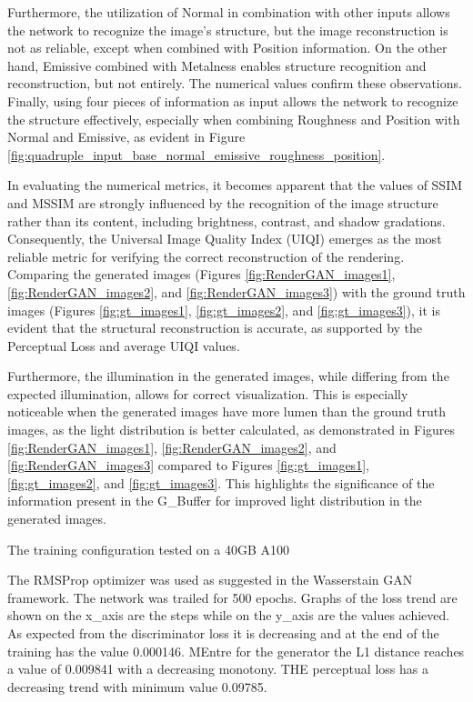 Furthermore, the utilization of Normal in combination with other inputs allows the network to recognize the image's structure, but the image reconstruction is not as reliable, except when combined with Position information. On the other hand, Emissive combined with Metalness enables structure recognition and reconstruction, but not entirely. The numerical values confirm these observations. Finally, using four pieces of information as input allows the network to recognize the structure effectively, especially when combining Roughness and Position with Normal and Emissive, as evident in Figure \ref{fig:quadruple_input_base_normal_emissive_roughness_position}.

In evaluating the numerical metrics, it becomes apparent that the values of SSIM and MSSIM are strongly influenced by the recognition of the image structure rather than its content, including brightness, contrast, and shadow gradations. Consequently, the Universal Image Quality Index (UIQI) emerges as the most reliable metric for verifying the correct reconstruction of the rendering. Comparing the generated images (Figures \ref{fig:RenderGAN_images1}, \ref{fig:RenderGAN_images2}, and \ref{fig:RenderGAN_images3}) with the ground truth images (Figures \ref{fig:gt_images1}, \ref{fig:gt_images2}, and \ref{fig:gt_images3}), it is evident that the structural reconstruction is accurate, as supported by the Perceptual Loss and average UIQI values.

Furthermore, the illumination in the generated images, while differing from the expected illumination, allows for correct visualization. This is especially noticeable when the generated images have more lumen than the ground truth images, as the light distribution is better calculated, as demonstrated in Figures \ref{fig:RenderGAN_images1}, \ref{fig:RenderGAN_images2}, and \ref{fig:RenderGAN_images3} compared to Figures \ref{fig:gt_images1}, \ref{fig:gt_images2}, and \ref{fig:gt_images3}. This highlights the significance of the information present in the G_Buffer for improved light distribution in the generated images.

\label{sec:rendering_result}
The training configuration tested on a 40GB A100

The RMSProp optimizer was used as suggested in the Wasserstain GAN framework.
The network was trailed for 500 epochs. Graphs of the loss trend are shown on the x_axis are the steps while on the y_axis are the values achieved. As expected from the discriminator loss it is decreasing and at the end of the training has the value 0.000146. MEntre for the generator the L1 distance reaches a value of 0.009841 with a decreasing monotony. THE perceptual loss has a decreasing trend with minimum value 0.09785.

